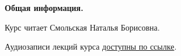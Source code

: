 \documentclass[main.tex]{subfiles}
\begin{document}
{\parindent0pt

\textbf{Общая информация.}

Курс читает Смольская Наталья Борисовна.

Аудиозаписи лекций курса \href{https://drive.google.com/drive/folders/1iSx2EjJJ98rhPpOsM4xGcJA7-7qitQHM?usp=sharing}{доступны по ссылке}.
}
\end{document}
